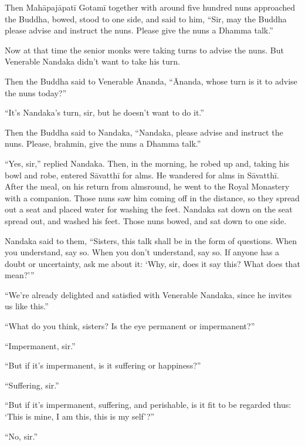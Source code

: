 \documentclass[12pt,openany]{book}%
\begin{document}
Then \textsanskrit{Mahāpajāpatī} \textsanskrit{Gotamī} together with around five hundred nuns approached the Buddha, bowed, stood to one side, and said to him, “Sir, may the Buddha please advise and instruct the nuns. Please give the nuns a Dhamma talk.” 

Now at that time the senior monks were taking turns to advise the nuns. But Venerable Nandaka didn’t want to take his turn. 

Then the Buddha said to Venerable Ānanda, “Ānanda, whose turn is it to advise the nuns today?” 

“It’s Nandaka’s turn, sir, but he doesn’t want to do it.” 

Then the Buddha said to Nandaka, “Nandaka, please advise and instruct the nuns. Please, brahmin, give the nuns a Dhamma talk.” 

“Yes, sir,” replied Nandaka. Then, in the morning, he robed up and, taking his bowl and robe, entered \textsanskrit{Sāvatthī} for alms. He wandered for alms in \textsanskrit{Sāvatthī}. After the meal, on his return from almsround, he went to the Royal Monastery with a companion. Those nuns saw him coming off in the distance, so they spread out a seat and placed water for washing the feet. Nandaka sat down on the seat spread out, and washed his feet. Those nuns bowed, and sat down to one side. 

Nandaka said to them, “Sisters, this talk shall be in the form of questions. When you understand, say so. When you don’t understand, say so. If anyone has a doubt or uncertainty, ask me about it: ‘Why, sir, does it say this? What does that mean?’” 

“We’re already delighted and satisfied with Venerable Nandaka, since he invites us like this.” 

“What do you think, sisters? Is the eye permanent or impermanent?” 

“Impermanent, sir.” 

“But if it’s impermanent, is it suffering or happiness?” 

“Suffering, sir.” 

“But if it’s impermanent, suffering, and perishable, is it fit to be regarded thus: ‘This is mine, I am this, this is my self’?” 

“No, sir.” 
\end{document}

